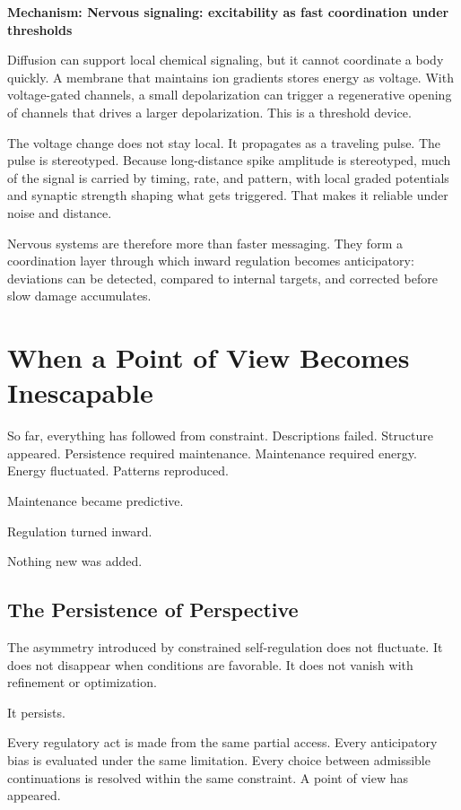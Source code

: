 \documentclass[11pt,twoside,openright]{book}
\newenvironment{mechanismbox}[1]
  {\begin{framed}\noindent\textbf{Mechanism: #1}\par\medskip}
  {\end{framed}}
\begin{document}
\begin{mechanismbox}{Nervous signaling: excitability as fast coordination under thresholds}

Diffusion can support local chemical signaling, but it cannot coordinate a body quickly. A membrane that maintains ion gradients stores energy as voltage. With voltage-gated channels, a small depolarization can trigger a regenerative opening of channels that drives a larger depolarization. This is a threshold device.

The voltage change does not stay local. It propagates as a traveling pulse. The pulse is stereotyped. Because long-distance spike amplitude is stereotyped, much of the signal is carried by timing, rate, and pattern, with local graded potentials and synaptic strength shaping what gets triggered. That makes it reliable under noise and distance.

Nervous systems are therefore more than faster messaging. They form a coordination layer through which inward regulation becomes anticipatory: deviations can be detected, compared to internal targets, and corrected before slow damage accumulates.

\end{mechanismbox}

\chapter{When a Point of View Becomes Inescapable}
\label{ch:point_of_view}

So far, everything has followed from constraint. Descriptions failed. Structure appeared. Persistence required maintenance. Maintenance required energy. Energy fluctuated. Patterns reproduced.

Maintenance became predictive.

Regulation turned inward.

Nothing new was added.

\section*{The Persistence of Perspective}

The asymmetry introduced by constrained self-regulation does not fluctuate. It does not disappear when conditions are favorable. It does not vanish with refinement or optimization.

It persists.

Every regulatory act is made from the same partial access. Every anticipatory bias is evaluated under the same limitation. Every choice between admissible continuations is resolved within the same constraint. A point of view has appeared.
\end{document}
